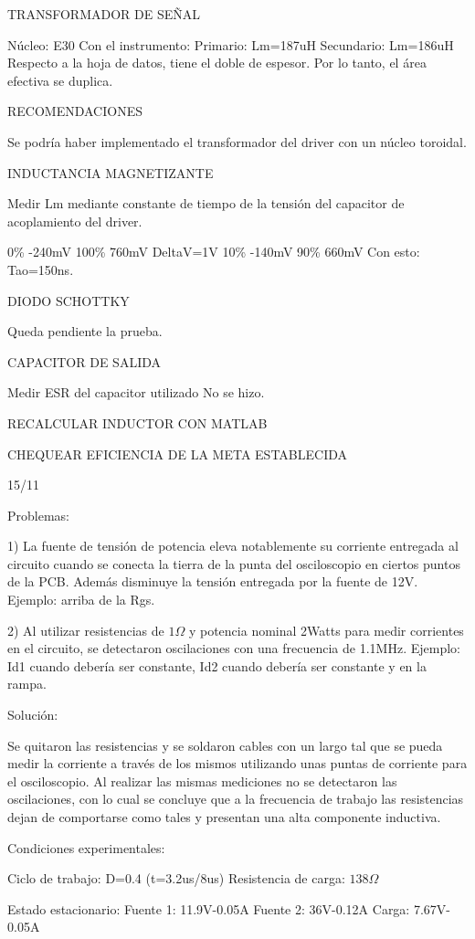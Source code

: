 TRANSFORMADOR DE SEÑAL 

Núcleo: E30
Con el instrumento:
Primario: Lm=187uH
Secundario: Lm=186uH
Respecto a la hoja de datos, tiene el doble de espesor. 
Por lo tanto, el área efectiva se duplica. 

RECOMENDACIONES

Se podría haber implementado el transformador del driver con un núcleo toroidal. 

INDUCTANCIA MAGNETIZANTE

Medir Lm mediante constante de tiempo de la tensión del capacitor de acoplamiento del driver.

0\% -240mV
100\% 760mV
DeltaV=1V
10\% -140mV
90\% 660mV
Con esto:
Tao=150ns. 

DIODO SCHOTTKY

Queda pendiente la prueba. 

CAPACITOR DE SALIDA 

Medir ESR del capacitor utilizado
No se hizo. 

RECALCULAR INDUCTOR CON MATLAB

CHEQUEAR EFICIENCIA DE LA META ESTABLECIDA 

15/11

Problemas:

1) La fuente de tensión de potencia eleva notablemente su corriente entregada al circuito 
cuando se conecta la tierra de la punta del osciloscopio en ciertos puntos de la PCB. 
Además disminuye la tensión entregada por la fuente de 12V. 
Ejemplo: arriba de la Rgs.

2) Al utilizar resistencias de $1\Omega$ y potencia nominal 2Watts para medir corrientes en el circuito, 
se detectaron oscilaciones con una frecuencia de 1.1MHz. Ejemplo: Id1 cuando debería ser constante, 
Id2 cuando debería ser constante y en la rampa. 

Solución: 

Se quitaron las resistencias y se soldaron cables con un largo tal que se pueda medir la corriente a través de los mismos 
utilizando unas puntas de corriente para el osciloscopio. Al realizar las mismas mediciones no se detectaron las oscilaciones,
con lo cual se concluye que a la frecuencia de trabajo las resistencias dejan de comportarse como tales y presentan una alta componente inductiva. 

Condiciones experimentales:

Ciclo de trabajo: D=0.4 (t=3.2us/8us)
Resistencia de carga: $138\Omega$

Estado estacionario: 
Fuente 1: 11.9V-0.05A
Fuente 2: 36V-0.12A
Carga: 7.67V-0.05A

